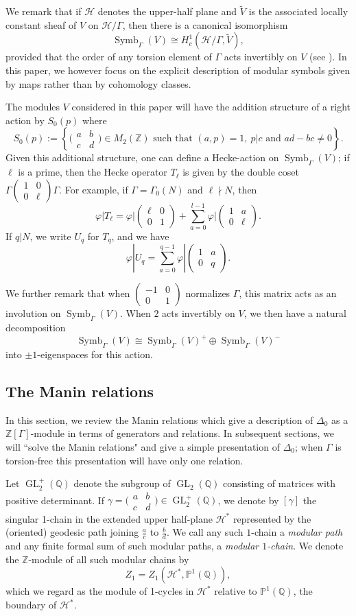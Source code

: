 \documentclass{amsart}
\theoremstyle{plain}
\theoremstyle{definition}
\renewcommand{\H}{\mathcal H}
\newcommand{\Z}{{\mathbb Z}}
\newcommand{\Q}{{\mathbb Q}}
\renewcommand{\P}{{\mathbb P}}
\newcommand{\smallmat}{\bigl( \begin{smallmatrix} a & b \\ c & d \end{smallmatrix} \bigr)}
\newcommand{\sop}{S_0(p)}
\newcommand{\psmallmat}[4]{\left( \begin{smallmatrix} #1 & #2 \\ #3 & #4 \end{smallmatrix} \right)}
\DeclareMathOperator{\GL}{GL}
\DeclareMathOperator{\Symb}{Symb}
\newcommand{\MS}[1]{\Symb_{\Gamma}(#1)}
\begin{document}
We remark that if $\H$ denotes the upper-half plane and $\widetilde{V}$ is the associated locally constant sheaf of $V$ on $\H/\Gamma$, then there is a canonical isomorphism 
$$
\MS{V} \cong H^1_c(\H / \Gamma,\widetilde{V}),
$$
provided that the order of any torsion element of $\Gamma$ acts invertibly on $V$ (see  \cite[Prop 4.2]{AshStevens86}).  In this paper, we however focus on the explicit description of modular symbols given by maps rather than by cohomology classes.

The modules $V$ considered in this paper will have the addition structure of a right action by $\sop$ where
$$
\sop := \left\{  \smallmat \in M_2(\Z) \text{~such~that~} (a,p) =1,~ p|c \text{~and~} ad-bc \neq 0 \right\}.
$$
Given this additional structure, one can define a Hecke-action on $\MS{V}$; if $\ell$ is a prime, then the Hecke operator $T_\ell$ is given by the double coset $\Gamma \psmallmat{1}{0}{0}{\ell} \Gamma$.  For example, if $\Gamma = \Gamma_0(N)$ and $\ell \nmid N$, then 
$$
\varphi | T_\ell = \varphi|\psmallmat{\ell}{0}{0}{1} +
\sum_{a=0}^{l-1} \varphi | \psmallmat{1}{a}{0}{\ell}.
$$
If $q | N$, we write $U_q$ for $T_q$, and we have
$$
\varphi | U_q = \sum_{a=0}^{q-1} \varphi |
\psmallmat{1}{a}{0}{q}.
$$

We further remark that when $\psmallmat{-1}{0}{0}{1}$ normalizes $\Gamma$, this matrix acts as an involution on $\MS{V}$.  When $2$ acts invertibly on $V$, we then have a natural decomposition 
$$\MS{V} \cong \MS{V}^+ \oplus \MS{V}^-$$ 
into $\pm 1$-eigenspaces for this action.


\subsection{The Manin relations}
\label{sec:manin}
In this section, we review the Manin relations which give a description of $\Delta_0$ as a $\Z[\Gamma]$-module in terms of generators and relations.  In subsequent sections, we will ``solve the Manin relations" and give a simple presentation of $\Delta_0$;  when $\Gamma$ is torsion-free this presentation will have only one relation.

Let $\GL^+_2(\Q)$ denote the subgroup of $\GL_2(\Q)$ consisting of matrices with positive determinant.  If $\gamma = \smallmat \in \GL^+_2(\Q)$, we denote by $[\gamma]$ the singular 1-chain in the extended upper half-plane $\H^*$ represented by the (oriented) geodesic path joining $\frac{a}{c}$ to $\frac{b}{d}$.  We call any such $1$-chain a {\it modular path} and any finite formal sum of such modular paths, a {\it modular $1$-chain}. We denote the $\Z$-module of all such modular chains by
$$
Z_1 = Z_1(\H^*,\P^1(\Q)),
$$
which we regard as the module of 1-cycles in $\H^*$ relative to $\P^1(\Q)$, the boundary  of $\H^*$.
\end{document}
